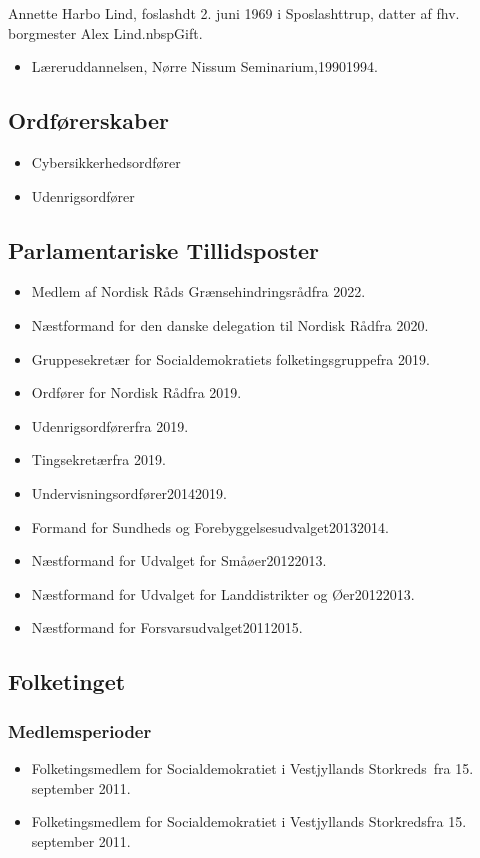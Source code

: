 \documentclass[11pt, a4paper]{awesome-cv}
\begin{document}
\makecvheader[R]
\makelettertitle
\begin{cvletter}
Annette Harbo Lind, foslashdt 2. juni 1969 i Sposlashttrup, datter af fhv. borgmester Alex Lind.nbspGift.

\begin{itemize}
\item Læreruddannelsen, Nørre Nissum Seminarium,19901994.
\end{itemize}
\subsection*{Ordførerskaber}
\begin{itemize}
\item Cybersikkerhedsordfører
\item Udenrigsordfører
\end{itemize}
\subsection*{Parlamentariske Tillidsposter}
\begin{itemize}
\item Medlem af Nordisk Råds Grænsehindringsrådfra 2022.
\item Næstformand for den danske delegation til Nordisk Rådfra 2020.
\item Gruppesekretær for Socialdemokratiets folketingsgruppefra 2019.
\item Ordfører for Nordisk Rådfra 2019.
\item Udenrigsordførerfra 2019.
\item Tingsekretærfra 2019.
\item Undervisningsordfører20142019.
\item Formand for Sundheds og Forebyggelsesudvalget20132014.
\item Næstformand for Udvalget for Småøer20122013.
\item Næstformand for Udvalget for Landdistrikter og Øer20122013.
\item Næstformand for Forsvarsudvalget20112015.
\end{itemize}
\subsection*{Folketinget}
\subsubsection*{Medlemsperioder}
\begin{itemize}
\item Folketingsmedlem for Socialdemokratiet i Vestjyllands Storkreds fra 15. september 2011.
\item Folketingsmedlem for Socialdemokratiet i Vestjyllands Storkredsfra 15. september 2011.
\end{itemize}

\end{cvletter}
\end{document}
